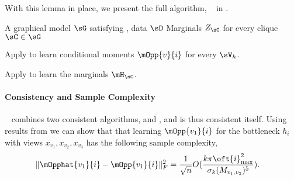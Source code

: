 With this lemma in place, we present the full algorithm, \LearnMarginals~
in .

\renewcommand{\algorithmicrequire}{\textbf{Input:}}
\renewcommand{\algorithmicensure}{\textbf{Output:}}
\begin{algorithm}
  \caption{\LearnMarginals}
  \label{algo:directed}
  \begin{algorithmic}
    \REQUIRE A graphical model $\sG$ satisfying , data $\sD$
    \ENSURE Marginals $Z_\sC$ for every clique $\sC \in \sG$

        \STATE Apply \TensorFactorize to learn conditional moments
        $\mOpp{v}{i}$ for every $\sV_h$.

      \ENDFOR
  \STATE Apply \LearnClique to learn the marginals $\mH_\sC$.
\ENDFOR
  \end{algorithmic}
\end{algorithm}

\paragraph{Consistency and Sample Complexity}

\LearnMarginals~ combines two consistent algorithms, \TensorFactorize and
  \LearnClique, and is thus consistent itself. Using results from
  \citet{anandkumar12moments,anandkumar13tensor} we can show that that
  learning $\mOpp{v_1}{i}$ for the bottleneck $h_i$ with views $x_{v_1},
  x_{v_2}, x_{v_3}$ has the following sample complexity,
\begin{align*}
  \|\mOpphat{v_1}{i} - \mOpp{v_1}{i}\|^2_F &= \frac{1}{\sqrt{n}} O( \frac{k {\pi\oft{i}}_{\max}^2}{\sigma_k(M_{v_1,v_2})^5} ). 
\end{align*}

